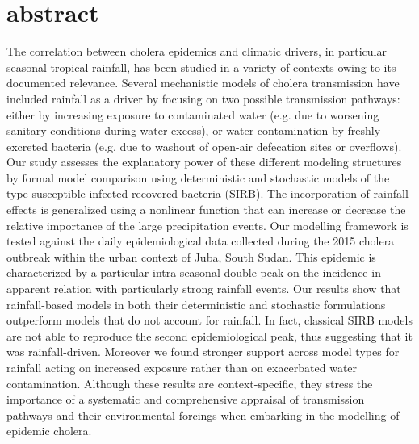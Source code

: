 
\section{abstract}
The correlation between cholera epidemics and climatic drivers, in particular seasonal tropical rainfall, has been studied in a variety of contexts owing to its documented relevance. Several mechanistic models of cholera transmission have included rainfall as a driver by focusing on two possible transmission pathways: either by increasing exposure to contaminated water (e.g. due to worsening sanitary conditions during water excess), or water contamination by freshly excreted bacteria (e.g. due to washout of open-air defecation sites or overflows). Our study assesses the explanatory power of these different modeling structures by formal model comparison using deterministic and stochastic models of the type susceptible-infected-recovered-bacteria (SIRB). The incorporation of rainfall effects is generalized using a nonlinear function that can increase or decrease the relative importance of the large precipitation events. Our modelling framework is tested against the daily epidemiological data collected during the 2015 cholera outbreak within the urban context of Juba, South Sudan. This epidemic is characterized by a particular intra-seasonal double peak on the incidence in apparent relation with particularly strong rainfall events. Our results show that rainfall-based models in both their deterministic and stochastic formulations outperform models that do not account for rainfall. In fact, classical SIRB models are not able to reproduce the second epidemiological peak, thus suggesting that it was rainfall-driven. Moreover we found stronger support across model types for rainfall acting on increased exposure rather than on exacerbated water contamination. Although these results are context-specific, they stress the importance of a systematic and comprehensive appraisal of transmission pathways and their environmental forcings when embarking in the modelling of epidemic cholera. %
 
